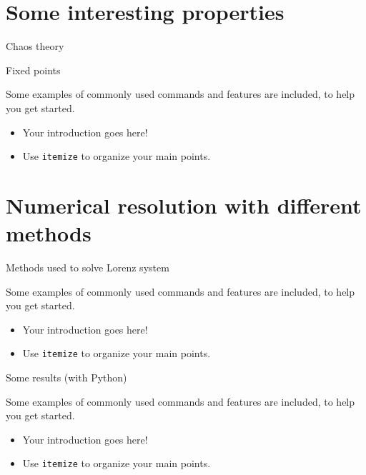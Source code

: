 \documentclass[10pt,xcolor={table,dvipsnames},t]{beamer}
\begin{document}
\section{Some interesting properties}
\begin{frame}{Chaos theory}
\end{frame}
\begin{frame}
     \begin{center}
    \end{center}
\end{frame}
\begin{frame}{Fixed points}

    Some examples of commonly used commands and features are included, to help you get started.
    \begin{itemize}
      \item Your introduction goes here!
      \item Use \texttt{itemize} to organize your main points.
    \end{itemize}

\end{frame}

\section{Numerical resolution with different methods}

\begin{frame}{Methods used to solve Lorenz system}

    Some examples of commonly used commands and features are included, to help you get started.
    \begin{itemize}
      \item Your introduction goes here!
      \item Use \texttt{itemize} to organize your main points.
    \end{itemize}

\end{frame}

\begin{frame}{Some results (with Python)}

    Some examples of commonly used commands and features are included, to help you get started.
    \begin{itemize}
      \item Your introduction goes here!
      \item Use \texttt{itemize} to organize your main points.
    \end{itemize}
    
\end{frame}
\end{document}
